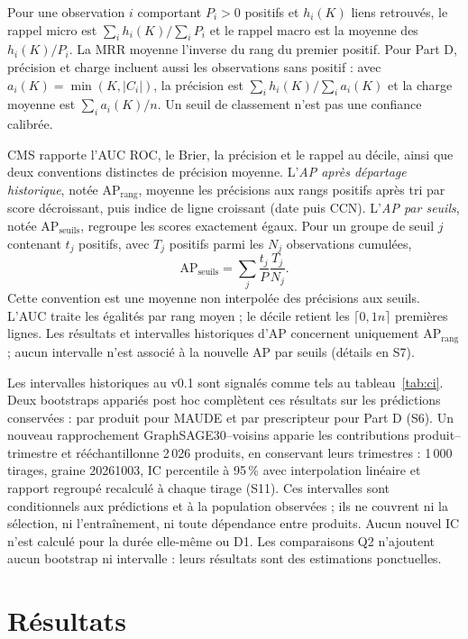 Pour une observation $i$ comportant $P_i>0$ positifs et $h_i(K)$ liens retrouvés, le rappel micro est $\sum_i h_i(K)/\sum_i P_i$ et le rappel macro est la moyenne des $h_i(K)/P_i$. La MRR moyenne l'inverse du rang du premier positif. Pour Part D, précision et charge incluent aussi les observations sans positif : avec $a_i(K)=\min(K,|C_i|)$, la précision est $\sum_i h_i(K)/\sum_i a_i(K)$ et la charge moyenne est $\sum_i a_i(K)/n$. Un seuil de classement n'est pas une confiance calibrée.

CMS rapporte l'AUC ROC, le Brier, la précision et le rappel au décile, ainsi que deux conventions distinctes de précision moyenne. L'\emph{AP après départage historique}, notée $\mathrm{AP}_{\mathrm{rang}}$, moyenne les précisions aux rangs positifs après tri par score décroissant, puis indice de ligne croissant (date puis CCN). L'\emph{AP par seuils}, notée $\mathrm{AP}_{\mathrm{seuils}}$, regroupe les scores exactement égaux. Pour un groupe de seuil $j$ contenant $t_j$ positifs, avec $T_j$ positifs parmi les $N_j$ observations cumulées,
\begin{equation}
 \mathrm{AP}_{\mathrm{seuils}}=\sum_j\frac{t_j}{P}\frac{T_j}{N_j}.
\end{equation}
Cette convention est une moyenne non interpolée des précisions aux seuils\cite{sklearnap}. L'AUC traite les égalités par rang moyen ; le décile retient les $\lceil0,1n\rceil$ premières lignes. Les résultats et intervalles historiques d'AP concernent uniquement $\mathrm{AP}_{\mathrm{rang}}$ ; aucun intervalle n'est associé à la nouvelle AP par seuils (détails en S7).

Les intervalles historiques au v0.1 sont signalés comme tels au tableau~\ref{tab:ci}. Deux bootstraps appariés post hoc complètent ces résultats sur les prédictions conservées : par produit pour MAUDE et par prescripteur pour Part D (S6). Un nouveau rapprochement GraphSAGE30--voisins apparie les contributions produit--trimestre et rééchantillonne 2\,026 produits, en conservant leurs trimestres : 1\,000 tirages, graine 20261003, IC percentile à 95\,\% avec interpolation linéaire et rapport regroupé recalculé à chaque tirage (S11). Ces intervalles sont conditionnels aux prédictions et à la population observées ; ils ne couvrent ni la sélection, ni l'entraînement, ni toute dépendance entre produits. Aucun nouvel IC n'est calculé pour la durée elle-même ou D1. Les comparaisons Q2 n'ajoutent aucun bootstrap ni intervalle : leurs résultats sont des estimations ponctuelles.


\section{Résultats}

